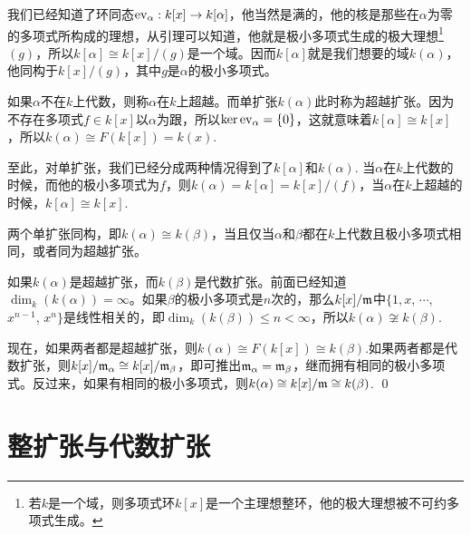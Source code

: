 我们已经知道了环同态$\operatorname{ev}_\alpha:k[x]\to k[\alpha]$，他当然是满的，他的核是那些在$\alpha$为零的多项式所构成的理想，从引理可以知道，他就是极小多项式生成的极大理想\footnote{若$k$是一个域，则多项式环$k[x]$是一个主理想整环，他的极大理想被不可约多项式生成。}$(g)$，所以$k[\alpha]\cong k[x]/(g)$是一个域。因而$k[\alpha]$就是我们想要的域$k(\alpha)$，他同构于$k[x]/(g)$，其中$g$是$\alpha$的极小多项式。

\para 如果$\alpha$不在$k$上代数，则称$\alpha$在$k$上超越。而单扩张$k(\alpha)$此时称为超越扩张。因为不存在多项式$f\in k[x]$以$\alpha$为跟，所以$\ker \operatorname{ev}_\alpha=\{0\}$，这就意味着$k[\alpha]\cong k[x]$，所以$k(\alpha)\cong F(k[x])=k(x)$.

至此，对单扩张，我们已经分成两种情况得到了$k[\alpha]$和$k(\alpha)$. 当$\alpha$在$k$上代数的时候，而他的极小多项式为$f$，则$k(\alpha)=k[\alpha]=k[x]/(f)$，当$\alpha$在$k$上超越的时候，$k[\alpha]\cong k[x]$.



\pro 两个单扩张同构，即$k(\alpha)\cong k(\beta)$，当且仅当$\alpha$和$\beta$都在$k$上代数且极小多项式相同，或者同为超越扩张。

\proof 
	如果$k(\alpha)$是超越扩张，而$k(\beta)$是代数扩张。前面已经知道$\dim_k(k(\alpha))=\infty$。如果$\beta$的极小多项式是$n$次的，那么$k[x]/\mathfrak{m}$中$\{1,x$, $\cdots$, $x^{n-1}$, $x^n\}$是线性相关的，即$\dim_k(k(\beta))\leq n<\infty$，所以$k(\alpha)\not\cong k(\beta)$.

	现在，如果两者都是超越扩张，则$k(\alpha)\cong F(k[x])\cong k(\beta)$.如果两者都是代数扩张，则$k[x]/\mathfrak{m}_\alpha\cong k[x]/\mathfrak{m}_\beta$，即可推出$\mathfrak{m}_\alpha=\mathfrak{m}_\beta$，继而拥有相同的极小多项式。反过来，如果有相同的极小多项式，则$k(\alpha)\cong k[x]/\mathfrak{m}\cong k(\beta)$.
\qed


\section{整扩张与代数扩张}


